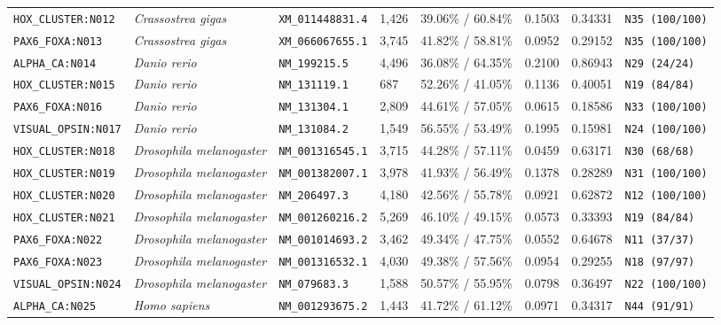 \documentclass[10pt,letterpaper]{article}
\begin{document}
\begin{longtable}{llllllll}
\texttt{HOX\_CLUSTER:N012} & \textit{Crassostrea gigas} & \texttt{XM\_011448831.4} & 1,426 & 39.06\% / 60.84\% & 0.1503 & 0.34331 & \texttt{N35 (100/100)} \\
\texttt{PAX6\_FOXA:N013} & \textit{Crassostrea gigas} & \texttt{XM\_066067655.1} & 3,745 & 41.82\% / 58.81\% & 0.0952 & 0.29152 & \texttt{N35 (100/100)} \\
\texttt{ALPHA\_CA:N014} & \textit{Danio rerio} & \texttt{NM\_199215.5} & 4,496 & 36.08\% / 64.35\% & 0.2100 & 0.86943 & \texttt{N29 (24/24)} \\
\texttt{HOX\_CLUSTER:N015} & \textit{Danio rerio} & \texttt{NM\_131119.1} & 687 & 52.26\% / 41.05\% & 0.1136 & 0.40051 & \texttt{N19 (84/84)} \\
\texttt{PAX6\_FOXA:N016} & \textit{Danio rerio} & \texttt{NM\_131304.1} & 2,809 & 44.61\% / 57.05\% & 0.0615 & 0.18586 & \texttt{N33 (100/100)} \\
\texttt{VISUAL\_OPSIN:N017} & \textit{Danio rerio} & \texttt{NM\_131084.2} & 1,549 & 56.55\% / 53.49\% & 0.1995 & 0.15981 & \texttt{N24 (100/100)} \\
\texttt{HOX\_CLUSTER:N018} & \textit{Drosophila melanogaster} & \texttt{NM\_001316545.1} & 3,715 & 44.28\% / 57.11\% & 0.0459 & 0.63171 & \texttt{N30 (68/68)} \\
\texttt{HOX\_CLUSTER:N019} & \textit{Drosophila melanogaster} & \texttt{NM\_001382007.1} & 3,978 & 41.93\% / 56.49\% & 0.1378 & 0.28289 & \texttt{N31 (100/100)} \\
\texttt{HOX\_CLUSTER:N020} & \textit{Drosophila melanogaster} & \texttt{NM\_206497.3} & 4,180 & 42.56\% / 55.78\% & 0.0921 & 0.62872 & \texttt{N12 (100/100)} \\
\texttt{HOX\_CLUSTER:N021} & \textit{Drosophila melanogaster} & \texttt{NM\_001260216.2} & 5,269 & 46.10\% / 49.15\% & 0.0573 & 0.33393 & \texttt{N19 (84/84)} \\
\texttt{PAX6\_FOXA:N022} & \textit{Drosophila melanogaster} & \texttt{NM\_001014693.2} & 3,462 & 49.34\% / 47.75\% & 0.0552 & 0.64678 & \texttt{N11 (37/37)} \\
\texttt{PAX6\_FOXA:N023} & \textit{Drosophila melanogaster} & \texttt{NM\_001316532.1} & 4,030 & 49.38\% / 57.56\% & 0.0954 & 0.29255 & \texttt{N18 (97/97)} \\
\texttt{VISUAL\_OPSIN:N024} & \textit{Drosophila melanogaster} & \texttt{NM\_079683.3} & 1,588 & 50.57\% / 55.95\% & 0.0798 & 0.36497 & \texttt{N22 (100/100)} \\
\texttt{ALPHA\_CA:N025} & \textit{Homo sapiens} & \texttt{NM\_001293675.2} & 1,443 & 41.72\% / 61.12\% & 0.0971 & 0.34317 & \texttt{N44 (91/91)} \\

\end{longtable}
\end{document}
